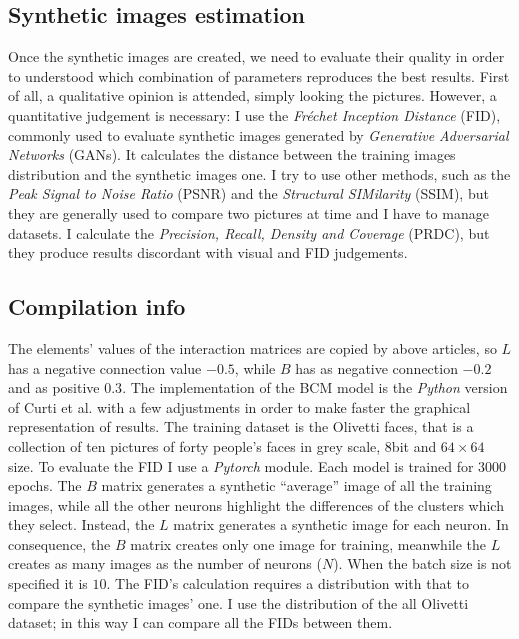 \documentclass[a4paper,12pt]{article}
\begin{document}
\subsection{Synthetic images estimation}
Once the synthetic images are created, we need to evaluate their quality in order to understood which combination of parameters reproduces the best results.
First of all, a qualitative opinion is attended, simply looking the pictures.
However, a quantitative judgement is necessary: I use the \emph{Fréchet Inception Distance} (FID)\cite{heusel:2017}, commonly used to evaluate synthetic images generated by \emph{Generative Adversarial Networks} (GANs).
It calculates the distance between the training images distribution and the synthetic images one.
I try to use other methods, such as the \emph{Peak Signal to Noise Ratio} (PSNR) and the \emph{Structural SIMilarity} (SSIM), but they are generally used to compare two pictures at time and I have to manage datasets.
I calculate the \emph{Precision, Recall, Density and Coverage} (PRDC)\cite{naeem:2020}, but they produce results discordant with visual and FID judgements.

\subsection{Compilation info}
The elements' values of the interaction matrices are copied by above articles, so $L$ has a negative connection value $-0.5$, while $B$ has as negative connection $-0.2$ and as positive $0.3$.
The implementation of the BCM model is the \emph{Python} version of Curti et al.\cite{curti:2020} with a few adjustments in order to make faster the graphical representation of results.
The training dataset is the Olivetti faces, that is a collection of ten pictures of forty people's faces in grey scale, $8$bit and $64 \times 64$ size.
To evaluate the FID I use a \emph{Pytorch} module\cite{seitzer:2020}.
Each model is trained for $3000$ epochs.
The $B$ matrix generates a synthetic ``average'' image of all the training images, while all the other neurons highlight the differences of the clusters which they select.
Instead, the $L$ matrix generates a synthetic image for each neuron.
In consequence, the $B$ matrix creates only one image for training, meanwhile the $L$ creates as many images as the number of neurons ($N$).
When the batch size is not specified it is $10$.
The FID's calculation requires a distribution with that to compare the synthetic images' one.
I use the distribution of the all Olivetti dataset; in this way I can compare all the FIDs between them.
\end{document}
